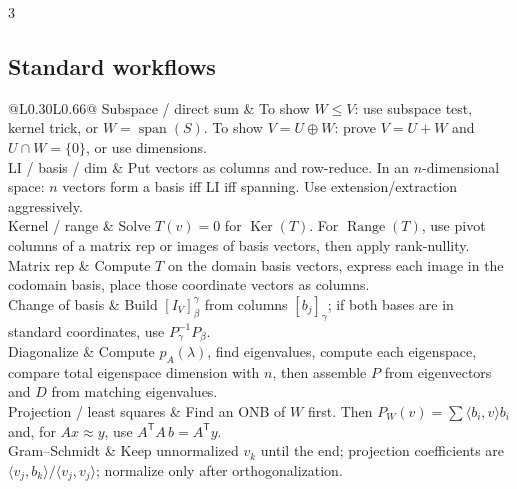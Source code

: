 \documentclass[10pt]{article}
\makeatletter
\newcommand{\Ker}{\operatorname{Ker}}
\newcommand{\Range}{\operatorname{Range}}
\newcommand{\spann}{\operatorname{span}}
\newcommand{\ip}[2]{\langle #1,#2\rangle}
\newcommand{\T}{^{\mathsf T}}
\newcommand{\cheattable}[1]{\begin{tabular}{@{}L{0.30\columnwidth}L{0.66\columnwidth}@{}}#1\end{tabular}}
\makeatother
\begin{document}
\begin{multicols}{3}
\subsection*{Standard workflows}
\cheattable{
Subspace / direct sum & To show $W\le V$: use subspace test, kernel trick, or $W=\spann(S)$. To show $V=U\oplus W$: prove $V=U+W$ and $U\cap W=\{0\}$, or use dimensions.\\
LI / basis / dim & Put vectors as columns and row-reduce. In an $n$-dimensional space: $n$ vectors form a basis iff LI iff spanning. Use extension/extraction aggressively.\\
Kernel / range & Solve $T(v)=0$ for $\Ker(T)$. For $\Range(T)$, use pivot columns of a matrix rep or images of basis vectors, then apply rank-nullity.\\
Matrix rep & Compute $T$ on the domain basis vectors, express each image in the codomain basis, place those coordinate vectors as columns.\\
Change of basis & Build $[I_V]^\gamma_\beta$ from columns $[b_j]_\gamma$; if both bases are in standard coordinates, use $P_\gamma^{-1}P_\beta$.\\
Diagonalize & Compute $p_A(\lambda)$, find eigenvalues, compute each eigenspace, compare total eigenspace dimension with $n$, then assemble $P$ from eigenvectors and $D$ from matching eigenvalues.\\
Projection / least squares & Find an ONB of $W$ first. Then $P_W(v)=\sum \ip{b_i}{v}b_i$ and, for $Ax\approx y$, use $A\T A\,b=A\T y$.\\
Gram--Schmidt & Keep unnormalized $v_k$ until the end; projection coefficients are $\ip{v_j}{b_k}/\ip{v_j}{v_j}$; normalize only after orthogonalization.\\
}


\end{multicols}
\end{document}
